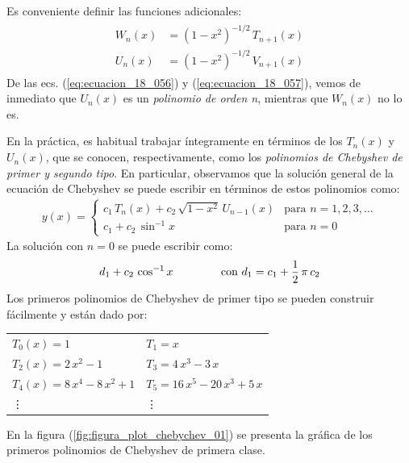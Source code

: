 Es conveniente definir las funciones adicionales:
\begin{align}
\begin{aligned}
W_{n} (x) &= (1 - x^{2})^{-1/2} \, T_{n+1} (x) \\[0.5em]
U_{n} (x) &= (1 - x^{2})^{-1/2} \, V_{n+1} (x)
\end{aligned}
\label{eq:ecuacion_18_058}
\end{align}
De las ecs. (\ref{eq:ecuacion_18_056}) y (\ref{eq:ecuacion_18_057}), vemos de inmediato que $U_{n}(x)$ es un \emph{polinomio de orden n}, mientras que $W_{n}(x)$ no lo es.
\par
En la práctica, es habitual trabajar íntegramente en términos de los $T_{n} (x)$ y $U_{n} (x)$, que se conocen, respectivamente, como los \emph{polinomios de Chebyshev de primer y segundo tipo}. En particular, observamos que la solución general de la ecuación de Chebyshev se puede escribir en términos de estos polinomios como:
\begin{align*}
y(x) = \begin{cases}
c_{1} \, T_{n} (x) + c_{2} \, \sqrt{1 -x^{2}} \, U_{n-1} (x) & \mbox{para  } n = 1, 2, 3, \ldots \\[0.5em]
c_{1} + c_{2} \, \sin^{-1} x & \mbox{para  } n = 0
\end{cases}
\end{align*}
La solución con $n = 0$ se puede escribir como:
\begin{align*}
d_{1} + c_{2} \, \cos^{-1} x \hspace{1.5cm} \mbox{con  } d_{1} = c_{1} + \dfrac{1}{2} \, \pi \, c_{2}
\end{align*}
Los primeros polinomios de Chebyshev de primer tipo se pueden construir fácilmente y están dado por:
\begin{table}[H]
\centering
\fontsize{14}{14}\selectfont
\begin{tabular}{p{6cm} p{6cm}}
$T_{0}(x) = 1$ & $T_{1} = x$ \\[0.5em]
$T_{2}(x) = 2 \, x^{2} - 1$ & $T_{3} = 4 \, x^{3} - 3 \, x$ \\[0.5em]
$T_{4}(x) = 8 \, x^{4} - 8 \, x^{2} + 1$ & $T_{5} = 16 \, x^{5} - 20 \, x^{3} + 5 \, x$ \\[0.5em]
\vdots & \vdots
\end{tabular}
\end{table}
En la figura (\ref{fig:figura_plot_chebychev_01}) se presenta la gráfica de los primeros polinomios de Chebyshev de primera clase.
